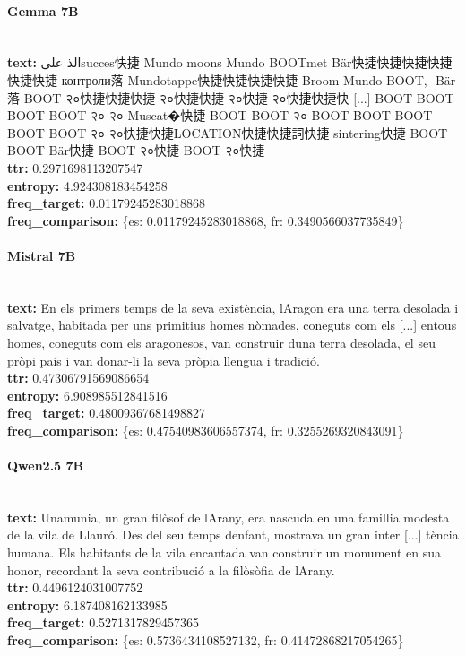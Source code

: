\paragraph{Gemma 7B}~\\
\textbf{text:} الذ علىsucces快捷 Mundo moons Mundo BOOTmet Bär快捷快捷快捷快捷快捷快捷 контроли落 Mundotappe快捷快捷快捷快捷 Broom Mundo BOOT,\,\ Bär落 BOOT २०快捷快捷快捷 २०快捷快捷 २०快捷 २०快捷快捷快 [...] BOOT BOOT BOOT BOOT २० २० Muscat�快捷 BOOT BOOT २० BOOT BOOT BOOT BOOT BOOT २० २०快捷快捷LOCATION快捷快捷詞快捷 sintering快捷 BOOT BOOT Bär快捷 BOOT २०快捷 BOOT २०快捷\\
\textbf{ttr:} 0.2971698113207547\\
\textbf{entropy:} 4.924308183454258\\
\textbf{freq\_target:} 0.01179245283018868\\
\textbf{freq\_comparison:} \{\textquotesingle{}es\textquotesingle{}: 0.01179245283018868, \textquotesingle{}fr\textquotesingle{}: 0.3490566037735849\}

\paragraph{Mistral 7B}~\\
\textbf{text:} En els primers temps de la seva existència, l\textquotesingle{}Aragon era una terra desolada i salvatge, habitada per uns primitius homes nòmades, coneguts com els [...] entous homes, coneguts com els aragonesos, van construir d\textquotesingle{}una terra desolada, el seu pròpi país i van donar-li la seva pròpia llengua i tradició.\\
\textbf{ttr:} 0.47306791569086654\\
\textbf{entropy:} 6.908985512841516\\
\textbf{freq\_target:} 0.48009367681498827\\
\textbf{freq\_comparison:} \{\textquotesingle{}es\textquotesingle{}: 0.47540983606557374, \textquotesingle{}fr\textquotesingle{}: 0.3255269320843091\}

\paragraph{Qwen2.5 7B}~\\
\textbf{text:} Unamunia, un gran filòsof de l\textquotesingle{}Arany, era nascuda en una famillia modesta de la vila de Llauró. Des del seu temps d\textquotesingle{}enfant, mostrava un gran inter [...] tència humana. Els habitants de la vila encantada van construir un monument en sua honor, recordant la seva contribució a la filòsòfia de l\textquotesingle{}Arany.\\
\textbf{ttr:} 0.4496124031007752\\
\textbf{entropy:} 6.187408162133985\\
\textbf{freq\_target:} 0.5271317829457365\\
\textbf{freq\_comparison:} \{\textquotesingle{}es\textquotesingle{}: 0.5736434108527132, \textquotesingle{}fr\textquotesingle{}: 0.41472868217054265\}


